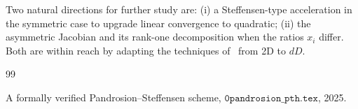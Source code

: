 \documentclass[11pt,a4paper]{article}
\theoremstyle{definition}
\theoremstyle{remark}
\begin{document}
Two natural directions for further study are:
(i) a Steffensen-type acceleration in the symmetric case to upgrade
linear convergence to quadratic;
(ii) the asymmetric Jacobian and its rank-one decomposition when the
ratios $x_i$ differ.  Both are within reach by adapting the techniques
of~\cite{0pandrosion_pth} from 2D to $dD$.

\begin{thebibliography}{99}

A formally verified Pandrosion--Steffensen scheme, $\texttt{0pandrosion\_pth.tex}$,
2025.

\end{thebibliography}
\end{document}
